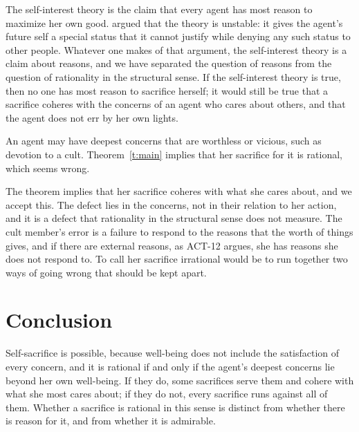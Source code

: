 \documentclass{situationist-preprint}
\begin{document}
\begin{reply}
The self-interest theory is the claim that every agent has most reason to maximize her own good. \citet{Parfit1984} argued that the theory is unstable: it gives the agent's future self a special status that it cannot justify while denying any such status to other people. Whatever one makes of that argument, the self-interest theory is a claim about reasons, and we have separated the question of reasons from the question of rationality in the structural sense. If the self-interest theory is true, then no one has most reason to sacrifice herself; it would still be true that a sacrifice coheres with the concerns of an agent who cares about others, and that the agent does not err by her own lights.
\end{reply}

\begin{objection}\label{o:bad}
An agent may have deepest concerns that are worthless or vicious, such as devotion to a cult. Theorem~\ref{t:main} implies that her sacrifice for it is rational, which seems wrong.
\end{objection}

\begin{reply}
The theorem implies that her sacrifice coheres with what she cares about, and we accept this. The defect lies in the concerns, not in their relation to her action, and it is a defect that rationality in the structural sense does not measure. The cult member's error is a failure to respond to the reasons that the worth of things gives, and if there are external reasons, as ACT-12 argues, she has reasons she does not respond to. To call her sacrifice irrational would be to run together two ways of going wrong that should be kept apart.
\end{reply}

\section{Conclusion}

Self-sacrifice is possible, because well-being does not include the satisfaction of every concern, and it is rational if and only if the agent's deepest concerns lie beyond her own well-being. If they do, some sacrifices serve them and cohere with what she most cares about; if they do not, every sacrifice runs against all of them. Whether a sacrifice is rational in this sense is distinct from whether there is reason for it, and from whether it is admirable.
\end{document}
